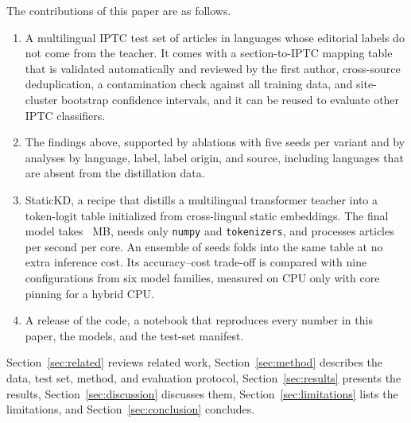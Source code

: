 The contributions of this paper are as follows.
\begin{enumerate}
  \item A multilingual IPTC test set of  articles in  languages whose editorial labels do not come from the teacher. It comes with a section-to-IPTC mapping table that is validated automatically and reviewed by the first author, cross-source deduplication, a contamination check against all training data, and site-cluster bootstrap confidence intervals, and it can be reused to evaluate other IPTC classifiers.
  \item The findings above, supported by ablations with five seeds per variant and by analyses by language, label, label origin, and source, including languages that are absent from the distillation data.
  \item StaticKD, a recipe that distills a multilingual transformer teacher into a token-logit table initialized from cross-lingual static embeddings. The final model takes ~MB, needs only \texttt{numpy} and \texttt{tokenizers}, and processes  articles per second per core. An ensemble of seeds folds into the same table at no extra inference cost. Its accuracy--cost trade-off is compared with nine configurations from six model families, measured on CPU only with core pinning for a hybrid CPU.
  \item A release of the code, a notebook that reproduces every number in this paper, the models, and the test-set manifest.
\end{enumerate}

Section~\ref{sec:related} reviews related work, Section~\ref{sec:method} describes the data, test set, method, and evaluation protocol, Section~\ref{sec:results} presents the results, Section~\ref{sec:discussion} discusses them, Section~\ref{sec:limitations} lists the limitations, and Section~\ref{sec:conclusion} concludes.
